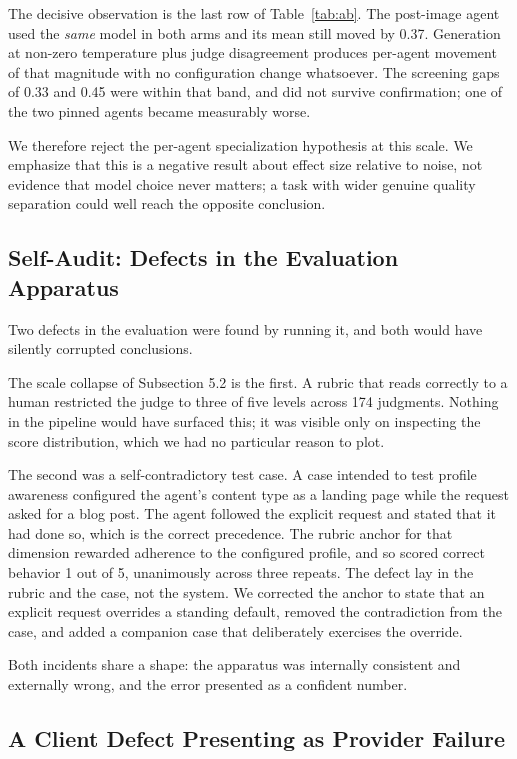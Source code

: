 \documentclass[9pt,twocolumn]{extarticle}
\newcommand{\tabref}[1]{Table~\ref{#1}}
\begin{document}
The decisive observation is the last row of \tabref{tab:ab}. The post-image
agent used the \textit{same} model in both arms and its mean still moved by
0.37. Generation at non-zero temperature plus judge disagreement produces
per-agent movement of that magnitude with no configuration change whatsoever.
The screening gaps of 0.33 and 0.45 were within that band, and did not survive
confirmation; one of the two pinned agents became measurably worse.

We therefore reject the per-agent specialization hypothesis at this scale. We
emphasize that this is a negative result about effect size relative to noise,
not evidence that model choice never matters; a task with wider genuine quality
separation could well reach the opposite conclusion.

\subsection{Self-Audit: Defects in the Evaluation Apparatus}

Two defects in the evaluation were found by running it, and both would have
silently corrupted conclusions.

The scale collapse of Subsection 5.2 is the first. A rubric that reads
correctly to a human restricted the judge to three of five levels across 174
judgments. Nothing in the pipeline would have surfaced this; it was visible
only on inspecting the score distribution, which we had no particular reason to
plot.

The second was a self-contradictory test case. A case intended to test profile
awareness configured the agent's content type as a landing page while the
request asked for a blog post. The agent followed the explicit request and
stated that it had done so, which is the correct precedence. The rubric anchor
for that dimension rewarded adherence to the configured profile, and so scored
correct behavior 1 out of 5, unanimously across three repeats. The defect lay
in the rubric and the case, not the system. We corrected the anchor to state
that an explicit request overrides a standing default, removed the
contradiction from the case, and added a companion case that deliberately
exercises the override.

Both incidents share a shape: the apparatus was internally consistent and
externally wrong, and the error presented as a confident number.

\subsection{A Client Defect Presenting as Provider Failure}
\end{document}
